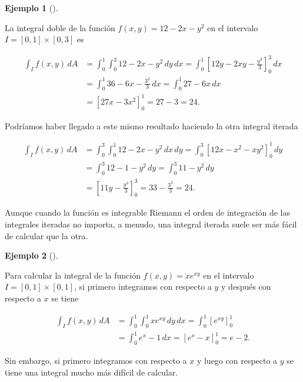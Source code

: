 \documentclass[
  a4paper,
]{scrreport}
\theoremstyle{plain}
\theoremstyle{definition}
\theoremstyle{plain}
\theoremstyle{plain}
\theoremstyle{definition}
\newtheorem{example}{Ejemplo}[chapter]
\theoremstyle{definition}
\theoremstyle{remark}
\begin{document}
\begin{example}[]\protect\hypertarget{exm-integrales-iteradas}{}\label{exm-integrales-iteradas}

La integral doble de la función \(f(x,y)=12-2x-y^2\) en el intervalo
\(I=[0,1]\times[0,3]\) es

\begin{align*}
\int_I f(x,y)\, dA 
&= \int_0^1 \int_0^3 12-2x-y^2 \,dy\,dx
= \int_0^1 \left[12y-2xy-\frac{y^3}{3}\right]_0^3\,dx \\
&= \int_0^1 36-6x-\frac{3^3}{3}\, dx
= \int_0^1 27-6x\,dx \\
&= [27x-3x^2]_0^1 
= 27-3
= 24. 
\end{align*}

Podríamos haber llegado a este mismo resultado haciendo la otra integral
iterada

\begin{align*}
\int_I f(x,y)\, dA 
&= \int_0^3 \int_0^1 12-2x-y^2 \,dx\,dy
= \int_0^3 \left[12x-x^2-xy^2\right]_0^1\,dy \\
&= \int_0^3 12-1-y^2\, dy
= \int_0^3 11-y^2\,dy \\
&= \left[11y-\frac{y^3}{3}\right]_0^3 
= 33 - \frac{3^3}{3}
= 24.
\end{align*}

\end{example}

\begin{tcolorbox}[enhanced jigsaw, titlerule=0mm, arc=.35mm, colframe=quarto-callout-important-color-frame, bottomrule=.15mm, opacitybacktitle=0.6, rightrule=.15mm, coltitle=black, colback=white, toprule=.15mm, title=\textcolor{quarto-callout-important-color}{\faExclamation}\hspace{0.5em}{Importante}, leftrule=.75mm, bottomtitle=1mm, opacityback=0, breakable, colbacktitle=quarto-callout-important-color!10!white, toptitle=1mm, left=2mm]

Aunque cuando la función es integrable Riemann el orden de integración
de las integrales iteradas no importa, a menudo, una integral iterada
suele ser más fácil de calcular que la otra.

\end{tcolorbox}

\begin{example}[]\protect\hypertarget{exm-integrales-iteradas-2}{}\label{exm-integrales-iteradas-2}

Para calcular la integral de la función \(f(x,y) = xe^{xy}\) en el
intervalo \(I=[0,1]\times [0,1]\), si primero integramos con respecto a
\(y\) y después con respecto a \(x\) se tiene

\begin{align*}
\int_I f(x,y)\, dA 
&= \int_0^1 \int_0^1 xe^{xy}\,dy\,dx 
= \int_0^1 \left[e^{xy}\right]_0^1 \\
&= \int_0^1 e^x-1\,dx
= [e^x-x]_0^1
= e - 2.
\end{align*}

Sin embargo, si primero integramos con respecto a \(x\) y luego con
respecto a \(y\) se tiene una integral mucho más difícil de calcular.

\end{example}
\end{document}
